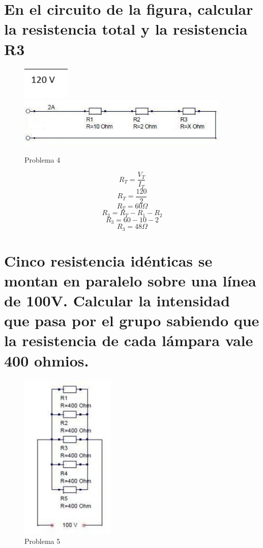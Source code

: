 \documentclass[stu, 12pt, letterpaper, donotrepeattitle, floatsintext, natbib, helv]{apa7}
\begin{document}
\section{En el circuito de la figura, calcular la resistencia total y la resistencia R3}
\begin{figure}[H]
    \includegraphics[width=0.2\textwidth]{Problem4-1.png}
    \includegraphics[width=0.9\textwidth]{Problem4-2.png}
    \caption{Problema 4}
    \label{fig:figureP4}
\end{figure}

\[R_T = \frac{V_T}{I_T}\]
\[R_T = \frac{120}{2}\]
\[R_T = 60\Omega\]
\[R_3 = R_T - R_1 - R_2\]
\[R_3 = 60 - 10 - 2\]
\[R_3 = 48\Omega\]

\section{Cinco resistencia idénticas se montan en paralelo sobre una línea de 100V. Calcular la intensidad que pasa por el grupo sabiendo que la resistencia de cada lámpara vale 400 ohmios.}
\begin{figure}[H]
    \centering
    \includegraphics[width=0.4\textwidth]{Problem5.png}
    \caption{Problema 5}
    \label{fig:figureP5}
\end{figure}
\end{document}
